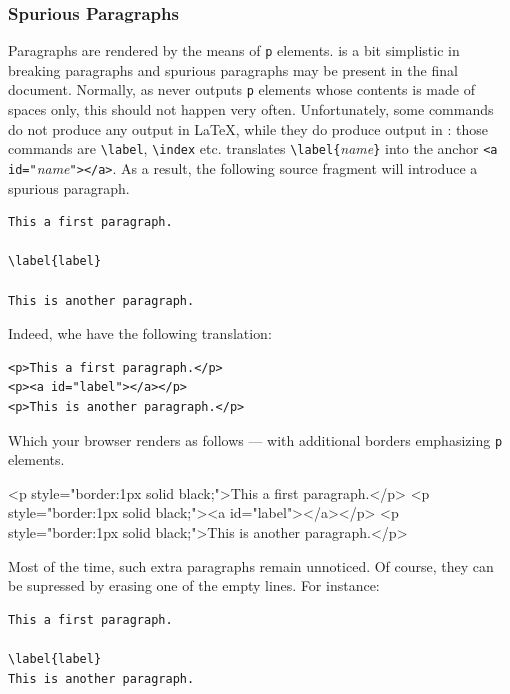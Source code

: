 \subsubsection{Spurious\label{spurious:par} Paragraphs}
Paragraphs are rendered by the means of \verb+p+ elements.
\hevea{} is a bit simplistic in breaking paragraphs and spurious paragraphs
may be present in the final \html{} document.
Normally, as \hevea{} never outputs \verb+p+ elements whose contents is
made of spaces only, this should not happen very often.
Unfortunately, some commands do not produce any output in \LaTeX,
while they do produce output in \hevea: those commands
are \verb+\label+, \verb+\index+ etc.
\hevea{} translates
\verb+\label{+\textit{name}\verb+}+ into the anchor
\verb+<a id="+\textit{name}\verb+"></a>+. As a result, the following
source fragment will introduce a spurious paragraph.
\begin{verbatim}
This a first paragraph.

\label{label}

This is another paragraph.
\end{verbatim}
Indeed, whe have the following translation:
\begin{verbatim}
<p>This a first paragraph.</p>
<p><a id="label"></a></p>
<p>This is another paragraph.</p>
\end{verbatim}
\ifhevea Which your browser renders as follows --- with additional borders
emphasizing \verb+p+ elements.
\begin{htmlout}%
\begin{rawhtml}
<p style="border:1px solid black;">This a first paragraph.</p>
<p style="border:1px solid black;"><a id="label"></a></p>
<p style="border:1px solid black;">This is another paragraph.</p>
\end{rawhtml}%
\end{htmlout}%
\fi

Most of the time, such extra paragraphs remain unnoticed.
Of course, they can be supressed by erasing one of the empty
lines. For instance:
\begin{verbatim}
This a first paragraph.

\label{label}
This is another paragraph.
\end{verbatim}

